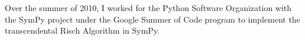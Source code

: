 \documentclass{beamer}
\numberwithin{equation}{section} %
\begin{document}

\begin{frame}
    \begin{figure}
   \end{figure}
    Over the summer of 2010, I worked for the Python Software
    Organization with the SymPy project under the Google Summer of Code
    program to implement the transcendental Risch Algorithm in SymPy.
\end{frame}
\end{document}
